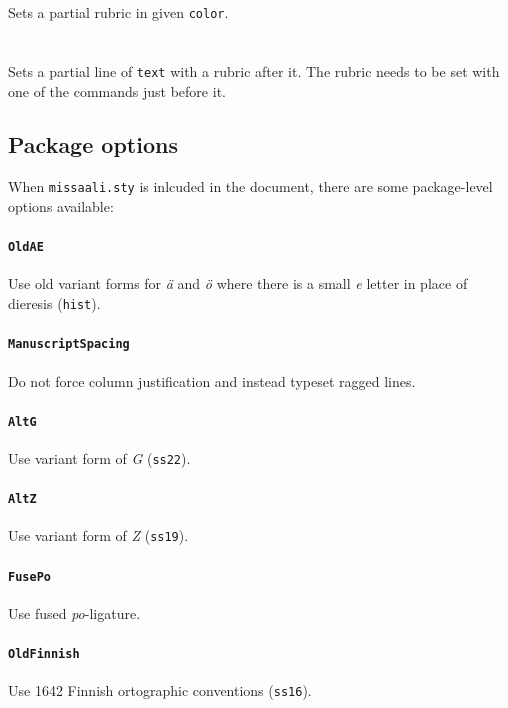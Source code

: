 \documentclass[a4paper, 12pt]{article}
\newcommand{\feature}[1]{\texttt{#1}}
\begin{document}
Sets a partial rubric in given \texttt{color}. 

\paragraph{}   \mbox{} \\

Sets a partial line of \texttt{text} with a rubric after it. The
rubric needs to be set with one of the 
commands just before it. 


\subsection{Package options}


When \texttt{missaali.sty} is inlcuded in the document, there are some
package-level options available:

\paragraph{\feature{OldAE}} Use old variant forms for \emph{ä} and
\emph{ö} where there is a small \emph{e} letter in place of dieresis
(\feature{hist}).

\paragraph{\feature{ManuscriptSpacing}} Do not force column
justification and instead typeset ragged lines.

\paragraph{\feature{AltG}} Use variant form of \emph{G} (\feature{ss22}).

\paragraph{\feature{AltZ}} Use variant form of \emph{Z} (\feature{ss19}).

\paragraph{\feature{FusePo}} Use fused \emph{po}-ligature.

\paragraph{\feature{OldFinnish}} Use 1642 Finnish ortographic
conventions (\feature{ss16}).
\end{document}
